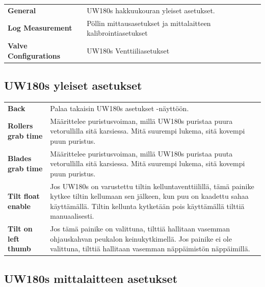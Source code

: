 \documentclass[12pt,a4paper,finnish]{uvmanual}
\begin{document}

\begin{tabular}{ L{0.2\textwidth} L{0.66\textwidth} }
\textbf{General} & UW180s hakkuukouran yleiset asetukset. \\
\textbf{Log Measurement} & Pöllin mittausasetukset ja mittalaitteen kalibrointiasetukset\\
\textbf{Valve Configurations} & UW180s Venttiiliasetukset 
\end{tabular}

\FloatBarrier
\subsection{UW180s yleiset asetukset}\label{ch:settings_uw180s_meas}


\begin{tabular}{ L{0.2\textwidth} L{0.66\textwidth} }
\textbf{Back} & Palaa takaisin UW180s asetukset -näyttöön. \\
\textbf{Rollers grab time} & Määrittelee puristusvoiman, millä UW180s puristaa puura vetorullilla sitä karsiessa. Mitä suurempi lukema, sitä kovempi puun puristus. \\
\textbf{Blades grab time} & Määrittelee puristusvoiman, millä UW180s puristaa puuta vetorullilla sitä karsiessa. Mitä suurempi lukema, sitä kovempi puun puristus. \\
\textbf{Tilt float enable} & Jos UW180s on varustettu tiltin kelluntaventtiilillä, tämä painike kytkee tiltin kellumaan sen jälkeen, kun puu on kaadettu sahaa käyttämällä. Tiltin kellunta kytketään pois käyttämällä tilttiä manuaalisesti. \\
\textbf{Tilt on left thumb} & Jos tämä painike on valittuna, tilttiä hallitaan vasemman ohjauskahvan peukalon keinukytkimellä. Jos painike ei ole valittuna, tilttiä hallitaan vasemman näppäimistön näppäimillä. \\
\end{tabular}

\FloatBarrier
\subsection{UW180s mittalaitteen asetukset}\label{ch:settings_uw180s_meas}

\end{document}
